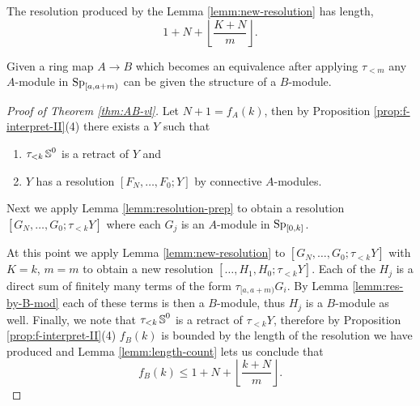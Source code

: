 \begin{lem}
  \label{lemm:length-count}
  The resolution produced by the Lemma \ref{lemm:new-resolution} has length,
  $$ 1 + N + \left\lfloor \frac{K + N}{m} \right\rfloor. $$
\end{lem}

\begin{lem}
  \label{lemm:res-by-B-mod}
  Given a ring map $A \to B$ which becomes an equivalence after applying $\tau_{<m}$ any $A$-module in $\operatorname{\mathrm{Sp}}_{[a,a+m)}$ can be given the structure of a $B$-module.
\end{lem}

\begin{proof}[Proof of Theorem \ref{thm:AB-vl}]
  Let $N+1 = f_A(k)$, then by Proposition \ref{prop:f-interpret-II}(4) there exists a $Y$ such that
  \begin{enumerate}
  \item $\tau_{<k}\operatorname{\mathbb{S}}^0$ is a retract of $Y$ and
  \item $Y$ has a resolution $[F_{N},\dots,F_0; Y]$ by connective $A$-modules.
  \end{enumerate}
  Next we apply Lemma \ref{lemm:resolution-prep} to obtain a resolution $[G_{N},\dots,G_0; \tau_{<k}Y]$ where each $G_j$ is an $A$-module in $\operatorname{\mathrm{Sp}}_{[0,k]}$.

  At this point we apply Lemma \ref{lemm:new-resolution} to
  $ [G_{N},\dots,G_0; \tau_{<k}Y] $ with $K = k$, $m = m$ to obtain a new resolution
  $ [\dots,H_1,H_0; \tau_{<k}Y] $.
  Each of the $H_j$ is a direct sum of finitely many terms of the form $\tau_{[a,a+m)}G_i$.
  By Lemma \ref{lemm:res-by-B-mod} each of these terms is then a $B$-module,
  thus $H_j$ is a $B$-module as well.
  Finally, we note that $\tau_{<k}\operatorname{\mathbb{S}}^0$ is a retract of $\tau_{<k}Y$, therefore by Proposition \ref{prop:f-interpret-II}(4) $f_B(k)$ is bounded by the length of the resolution we have produced and Lemma \ref{lemm:length-count} lets us conclude that
  $$ f_B(k) \leq 1 + N + \left\lfloor \frac{k + N}{m} \right\rfloor. $$
\end{proof}

